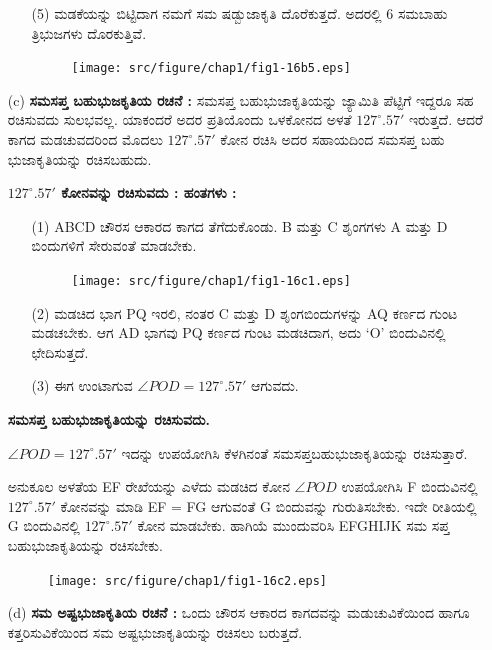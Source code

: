 \begin{itemize}
\begin{enumerate}
\item[(5)] ಮಡಕೆಯನ್ನು ಬಿಟ್ಟಿದಾಗ ನಮಗೆ ಸಮ ಷಡ್ಬುಜಾಕೃತಿ ದೊರೆಕುತ್ತದೆ. ಅದರಲ್ಲಿ 6 ಸಮಬಾಹು ತ್ರಿಭುಜಗಳು ದೊರಕುತ್ತಿವೆ. 
\begin{figure}[H]
\centering
\texttt{[image: src/figure/chap1/fig1-16b5.eps]}
\end{figure}
\end{enumerate}

\item[(c)]  \textbf{ಸಮಸಪ್ತ ಬಹುಭುಜಕೃತಿಯ ರಚನೆ :} ಸಮಸಪ್ತ ಬಹುಭುಜಾಕೃತಿಯನ್ನು ಜ್ಯಾಮಿತಿ ಪೆಟ್ಟಿಗೆ ಇದ್ದರೂ ಸಹ ರಚಿಸುವದು ಸುಲಭವಲ್ಲ. ಯಾಕಂದರೆ ಅದರ ಪ್ರತಿಯೊಂದು ಒಳಕೋನದ ಅಳತೆ $127^\circ.57'$ ಇರುತ್ತದೆ. ಆದರೆ ಕಾಗದ ಮಡಚುವದರಿಂದ ಮೊದಲು $127^\circ.57'$ ಕೋನ ರಚಿಸಿ ಅದರ ಸಹಾಯದಿಂದ ಸಮಸಪ್ತ ಬಹು ಭುಜಾಕೃತಿಯನ್ನು ರಚಿಸಬಹುದು. 

\noindent
\textbf{$127^\circ.57'$ ಕೋನವನ್ನು ರಚಿಸುವದು : ಹಂತಗಳು :}
\begin{enumerate}
\item[(1)] ABCD ಚೌರಸ ಆಕಾರದ ಕಾಗದ ತೆಗೆದುಕೊಂಡು. B ಮತ್ತು C ಶೃಂಗಗಳು A ಮತ್ತು D ಬಿಂದುಗಳಿಗೆ ಸೇರುವಂತೆ ಮಾಡಬೇಕು.
 \begin{figure}[H]
\centering
\texttt{[image: src/figure/chap1/fig1-16c1.eps]}
\end{figure}

\item[(2)] ಮಡಚಿದ ಭಾಗ PQ ಇರಲಿ, ನಂತರ C ಮತ್ತು D ಶೃಂಗಬಿಂದುಗಳನ್ನು AQ ಕರ್ಣದ ಗುಂಟ ಮಡಚಬೇಕು. ಆಗ AD ಭಾಗವು  PQ ಕರ್ಣದ ಗುಂಟ ಮಡಚಿದಾಗ, ಅದು `O' ಬಿಂದುವಿನಲ್ಲಿ ಛೇದಿಸುತ್ತದೆ. 
 
\item[(3)] ಈಗ ಉಂಟಾಗುವ $\angle POD = 127^\circ.57'$ ಆಗುವದು. 
\end{enumerate}

\medskip
\noindent
\textbf{ಸಮಸಪ್ತ ಬಹುಭುಜಾಕೃತಿಯನ್ನು ರಚಿಸುವದು.}

$\angle POD =127^\circ .57'$ ಇದನ್ನು ಉಪಯೋಗಿಸಿ ಕೆಳಗಿನಂತೆ ಸಮಸಪ್ತಬಹುಭುಜಾಕೃತಿಯನ್ನು ರಚಿಸುತ್ತಾರೆ. 

ಅನುಕೂಲ ಅಳತೆಯ EF ರೇಖೆಯನ್ನು ಎಳೆದು ಮಡಚಿದ ಕೋನ $\angle POD$ ಉಪಯೋಗಿಸಿ F ಬಿಂದುವಿನಲ್ಲಿ  $127^\circ .57'$ ಕೋನವನ್ನು ಮಾಡಿ  EF = FG ಆಗುವಂತೆ G ಬಿಂದುವನ್ನು ಗುರುತಿಸಬೇಕು.  ಇದೇ ರೀತಿಯಲ್ಲಿ G ಬಿಂದುವಿನಲ್ಲಿ $127^\circ .57'$ ಕೋನ ಮಾಡಬೇಕು. ಹಾಗಿಯೆ ಮುಂದುವರಿಸಿ EFGHIJK ಸಮ ಸಪ್ತ ಬಹುಭುಜಾಕೃತಿಯನ್ನು ರಚಿಸಬೇಕು.
\begin{figure}[H]
\centering
\texttt{[image: src/figure/chap1/fig1-16c2.eps]}\\
\end{figure}
 
 
\item[(d)] \textbf{ಸಮ ಅಷ್ಟಭುಜಾಕೃತಿಯ ರಚನೆ :} ಒಂದು ಚೌರಸ ಆಕಾರದ ಕಾಗದವನ್ನು ಮಡುಚುವಿಕೆಯಿಂದ ಹಾಗೂ ಕತ್ತರಿಸುವಿಕೆಯಿಂದ ಸಮ ಅಷ್ಟಭುಜಾಕೃತಿಯನ್ನು ರಚಿಸಲು ಬರುತ್ತದೆ. 
\end{itemize}

